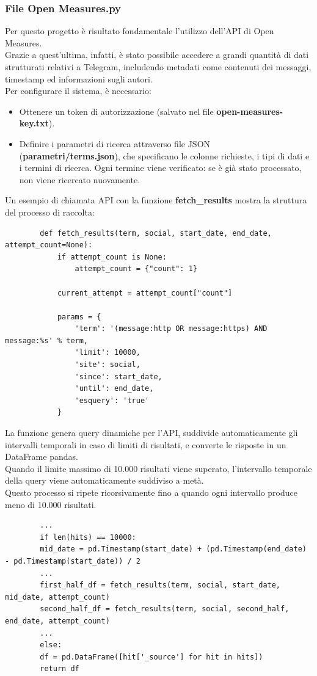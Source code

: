 \documentclass[12pt]{article}
\begin{document}
	\subsubsection{File Open Measures.py}
	Per questo progetto è risultato fondamentale l'utilizzo dell'API di Open Measures.\\
	Grazie a quest'ultima, infatti, è stato possibile accedere a grandi quantità di dati strutturati relativi a Telegram, includendo metadati come contenuti dei messaggi, timestamp ed informazioni sugli autori.\\
	Per configurare il sistema, è necessario:
	\begin{itemize}[label=] 
		\item Ottenere un token di autorizzazione (salvato nel file \textbf{open-measures-key.txt}).
		\item Definire i parametri di ricerca attraverso file JSON (\textbf{parametri/terms.json}), che specificano le colonne richieste, i tipi di dati e i termini di ricerca. Ogni termine viene verificato: se è già stato processato, non viene ricercato nuovamente.
	\end{itemize}
	Un esempio di chiamata API con la funzione \textbf{fetch\_results} mostra la struttura del processo di raccolta:
	\begin{lstlisting}
		def fetch_results(term, social, start_date, end_date, attempt_count=None):
			if attempt_count is None:
				attempt_count = {"count": 1}
		
			current_attempt = attempt_count["count"]
		
			params = {
				'term': '(message:http OR message:https) AND message:%s' % term,
				'limit': 10000,
				'site': social,
				'since': start_date,
				'until': end_date,
				'esquery': 'true'
			}
	\end{lstlisting}
	La funzione genera query dinamiche per l’API, suddivide automaticamente gli intervalli temporali in caso di limiti di risultati, e converte le risposte in un DataFrame pandas.\\
	Quando il limite massimo di 10.000 risultati viene superato, l'intervallo temporale della query viene automaticamente suddiviso a metà.\\ Questo processo si ripete ricorsivamente fino a quando ogni intervallo produce meno di 10.000 risultati.
	\begin{lstlisting}
		...
		if len(hits) == 10000:
		mid_date = pd.Timestamp(start_date) + (pd.Timestamp(end_date) - pd.Timestamp(start_date)) / 2
		...
		first_half_df = fetch_results(term, social, start_date, mid_date, attempt_count)
		second_half_df = fetch_results(term, social, second_half, end_date, attempt_count)
		...
		else:
		df = pd.DataFrame([hit['_source'] for hit in hits])
		return df
	\end{lstlisting}
\end{document}
